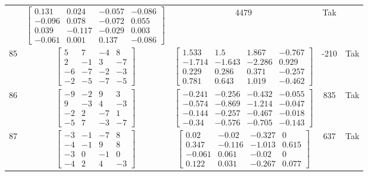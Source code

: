 \documentclass[a4paper,12pt]{article}
\begin{document}
\begin{tabular}{c c c c c}
&
$\begin{bmatrix} 0.131 & 0.024 & -0.057 & -0.086 \\ -0.096 & 0.078 & -0.072 & 0.055 \\ 0.039 & -0.117 & -0.029 & 0.003 \\ -0.061 & 0.001 & 0.137 & -0.086 \end{bmatrix}$
&
4479
&
Tak
\\
85
&
$\begin{bmatrix} 5 & 7 & -4 & 8 \\ 2 & -1 & 3 & -7 \\ -6 & -7 & -2 & -3 \\ -2 & -5 & -7 & -5 \end{bmatrix}$
&
$\begin{bmatrix} 1.533 & 1.5 & 1.867 & -0.767 \\ -1.714 & -1.643 & -2.286 & 0.929 \\ 0.229 & 0.286 & 0.371 & -0.257 \\ 0.781 & 0.643 & 1.019 & -0.462 \end{bmatrix}$
&
-210
&
Tak
\\
86
&
$\begin{bmatrix} -9 & -2 & 9 & 3 \\ 9 & -3 & 4 & -3 \\ -2 & 2 & -7 & 1 \\ -5 & 7 & -3 & -7 \end{bmatrix}$
&
$\begin{bmatrix} -0.241 & -0.256 & -0.432 & -0.055 \\ -0.574 & -0.869 & -1.214 & -0.047 \\ -0.144 & -0.257 & -0.467 & -0.018 \\ -0.34 & -0.576 & -0.705 & -0.143 \end{bmatrix}$
&
835
&
Tak
\\
87
&
$\begin{bmatrix} -3 & -1 & -7 & 8 \\ -4 & -1 & 9 & 8 \\ -3 & 0 & -1 & 0 \\ -4 & 2 & 4 & -3 \end{bmatrix}$
&
$\begin{bmatrix} 0.02 & -0.02 & -0.327 & 0 \\ 0.347 & -0.116 & -1.013 & 0.615 \\ -0.061 & 0.061 & -0.02 & 0 \\ 0.122 & 0.031 & -0.267 & 0.077 \end{bmatrix}$
&
637
&
Tak
\\

\end{tabular}
\end{document}
